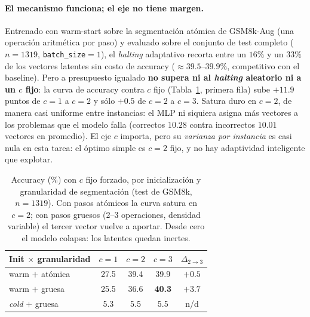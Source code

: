 \documentclass[11pt]{article}
\begin{document}
\paragraph{El mecanismo funciona; el eje no tiene margen.} Entrenado con warm-start sobre la segmentación atómica de GSM8k-Aug (una operación aritmética por paso) y evaluado sobre el conjunto de test completo ($n{=}1319$, \texttt{batch\_size}$=1$), el \textit{halting} adaptativo recorta entre un $16\%$ y un $33\%$ de los vectores latentes sin costo de accuracy ($\approx 39.5$--$39.9\%$, competitivo con el baseline). Pero a presupuesto igualado \textbf{no supera ni al \textit{halting} aleatorio ni a un $c$ fijo}: la curva de accuracy contra $c$ fijo (Tabla~\ref{tab:opcionb}, primera fila) sube $+11.9$ puntos de $c{=}1$ a $c{=}2$ y sólo $+0.5$ de $c{=}2$ a $c{=}3$. Satura duro en $c{=}2$, de manera casi uniforme entre instancias: el MLP ni siquiera asigna más vectores a los problemas que el modelo falla (correctos $10.28$ contra incorrectos $10.01$ vectores en promedio). El eje $c$ importa, pero su \emph{varianza por instancia} es casi nula en esta tarea: el óptimo simple es $c{=}2$ fijo, y no hay adaptividad inteligente que explotar.

\begin{table}[t]
  \centering
  \small
  \begin{tabular}{lcccc}
    \toprule
    \textbf{Init $\times$ granularidad} & $c{=}1$ & $c{=}2$ & $c{=}3$ & $\Delta_{2\rightarrow3}$ \\
    \midrule
    warm $+$ atómica & 27.5 & 39.4 & 39.9 & $+0.5$ \\
    warm $+$ gruesa & 25.5 & 36.6 & \textbf{40.3} & $+3.7$ \\
    \textit{cold} $+$ gruesa & 5.3 & 5.5 & 5.5 & n/d \\
    \bottomrule
  \end{tabular}
  \caption{Accuracy (\%) con $c$ fijo forzado, por inicialización y granularidad de segmentación (test de GSM8k, $n{=}1319$). Con pasos atómicos la curva satura en $c{=}2$; con pasos gruesos (2--3 operaciones, densidad variable) el tercer vector vuelve a aportar. Desde cero el modelo colapsa: los latentes quedan inertes.}
  \label{tab:opcionb}
\end{table}
\end{document}
